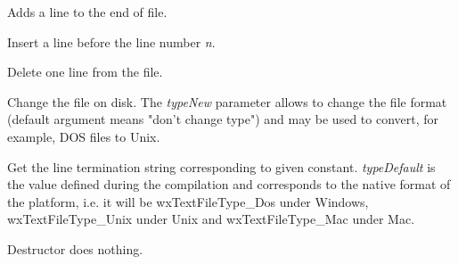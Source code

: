 
Adds a line to the end of file.

\label{wxtextfileinsertline}


Insert a line before the line number {\it n}.

\label{wxtextfileremoveline}


Delete one line from the file.

\label{wxtextfilewrite}


Change the file on disk. The {\it typeNew} parameter allows to change the
file format (default argument means "don't change type") and may be used to
convert, for example, DOS files to Unix.

\label{wxtextfilegeteol}


Get the line termination string corresponding to given constant. {\it typeDefault} is
the value defined during the compilation and corresponds to the native format of the
platform, i.e. it will be wxTextFileType\_Dos under Windows, wxTextFileType\_Unix under
Unix and wxTextFileType\_Mac under Mac.

\label{wxtextfiledtor}


Destructor does nothing.

